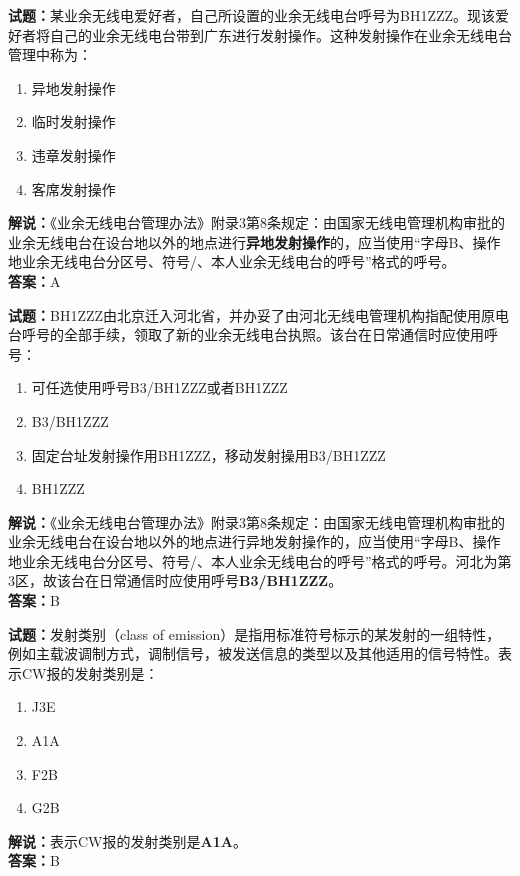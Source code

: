 \documentclass{ctexbook}
\begin{document}
\bigskip

\noindent\textbf{试题：}某业余无线电爱好者，自己所设置的业余无线电台呼号为BH1ZZZ。现该爱好者将自己的业余无线电台带到广东进行发射操作。这种发射操作在业余无线电台管理中称为：
\begin{enumerate}[leftmargin=3em]
  \item 异地发射操作
  \item 临时发射操作
  \item 违章发射操作
  \item 客席发射操作
\end{enumerate}
\noindent\textbf{解说：}《业余无线电台管理办法》附录3第8条规定：由国家无线电管理机构审批的业余无线电台在设台地以外的地点进行\textbf{异地发射操作}的，应当使用“字母B、操作地业余无线电台分区号、符号/、本人业余无线电台的呼号”格式的呼号。\\\noindent\textbf{答案：}A

\bigskip

\noindent\textbf{试题：}BH1ZZZ由北京迁入河北省，并办妥了由河北无线电管理机构指配使用原电台呼号的全部手续，领取了新的业余无线电台执照。该台在日常通信时应使用呼号：
\begin{enumerate}[leftmargin=3em]
  \item 可任选使用呼号B3/BH1ZZZ或者BH1ZZZ
  \item B3/BH1ZZZ
  \item 固定台址发射操作用BH1ZZZ，移动发射操用B3/BH1ZZZ
  \item BH1ZZZ
\end{enumerate}
\noindent\textbf{解说：}《业余无线电台管理办法》附录3第8条规定：由国家无线电管理机构审批的业余无线电台在设台地以外的地点进行异地发射操作的，应当使用“字母B、操作地业余无线电台分区号、符号/、本人业余无线电台的呼号”格式的呼号。河北为第3区，故该台在日常通信时应使用呼号\textbf{B3/BH1ZZZ}。\\\noindent\textbf{答案：}B

\bigskip

\noindent\textbf{试题：}发射类别（class of emission）是指用标准符号标示的某发射的一组特性，例如主载波调制方式，调制信号，被发送信息的类型以及其他适用的信号特性。表示CW报的发射类别是：
\begin{enumerate}[leftmargin=3em]
  \item J3E
  \item A1A
  \item F2B
  \item G2B
\end{enumerate}
\noindent\textbf{解说：}表示CW报的发射类别是\textbf{A1A}。\\\noindent\textbf{答案：}B
\end{document}
